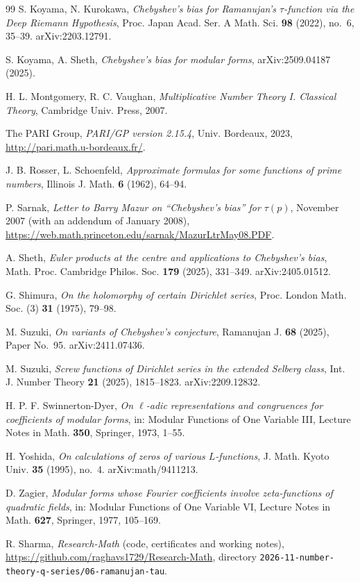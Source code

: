 \documentclass[11pt]{amsart}
\theoremstyle{definition}
\numberwithin{equation}{section}
\newcommand{\repo}{\texttt{2026-11-number-theory-q-series/06-ramanujan-tau}}
\begin{document}
\begin{thebibliography}{99}
 S. Koyama, N. Kurokawa, \emph{Chebyshev's bias for Ramanujan's $\tau$-function via the Deep Riemann Hypothesis}, Proc. Japan Acad. Ser. A Math. Sci. \textbf{98} (2022), no.~6, 35--39. arXiv:2203.12791.

 S. Koyama, A. Sheth, \emph{Chebyshev's bias for modular forms}, arXiv:2509.04187 (2025).

 H. L. Montgomery, R. C. Vaughan, \emph{Multiplicative Number Theory I. Classical Theory}, Cambridge Univ. Press, 2007.

 The PARI Group, \emph{PARI/GP version 2.15.4}, Univ. Bordeaux, 2023, \url{http://pari.math.u-bordeaux.fr/}.

 J. B. Rosser, L. Schoenfeld, \emph{Approximate formulas for some functions of prime numbers}, Illinois J. Math. \textbf{6} (1962), 64--94.

 P. Sarnak, \emph{Letter to Barry Mazur on ``Chebyshev's bias'' for $\tau(p)$}, November 2007 (with an addendum of January 2008), \url{https://web.math.princeton.edu/sarnak/MazurLtrMay08.PDF}.

 A. Sheth, \emph{Euler products at the centre and applications to Chebyshev's bias}, Math. Proc. Cambridge Philos. Soc. \textbf{179} (2025), 331--349. arXiv:2405.01512.

 G. Shimura, \emph{On the holomorphy of certain Dirichlet series}, Proc. London Math. Soc. (3) \textbf{31} (1975), 79--98.

 M. Suzuki, \emph{On variants of Chebyshev's conjecture}, Ramanujan J. \textbf{68} (2025), Paper No.~95. arXiv:2411.07436.

 M. Suzuki, \emph{Screw functions of Dirichlet series in the extended Selberg class}, Int. J. Number Theory \textbf{21} (2025), 1815--1823. arXiv:2209.12832.

 H. P. F. Swinnerton-Dyer, \emph{On $\ell$-adic representations and congruences for coefficients of modular forms}, in: Modular Functions of One Variable III, Lecture Notes in Math. \textbf{350}, Springer, 1973, 1--55.

 H. Yoshida, \emph{On calculations of zeros of various $L$-functions}, J. Math. Kyoto Univ. \textbf{35} (1995), no.~4. arXiv:math/9411213.

 D. Zagier, \emph{Modular forms whose Fourier coefficients involve zeta-functions of quadratic fields}, in: Modular Functions of One Variable VI, Lecture Notes in Math. \textbf{627}, Springer, 1977, 105--169.

 R. Sharma, \emph{Research-Math} (code, certificates and working notes), \url{https://github.com/raghavs1729/Research-Math}, directory \repo.

\end{thebibliography}
\end{document}
